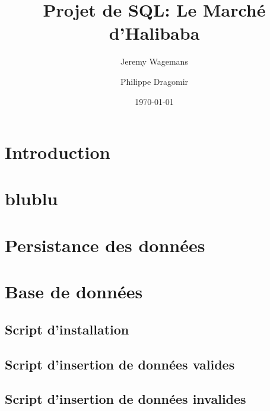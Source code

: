 \documentclass[11pt,a4paper]{report}
\title{Projet de SQL: Le Marché d'Halibaba}
\author{Jeremy Wagemans \and Philippe Dragomir}
\date{\today}
\begin{document}

\maketitle

\tableofcontents

\begingroup
\setlength{\parskip}{\baselineskip}
\chapter{Introduction}

\endgroup

\setlength{\parskip}{0pt}
\chapter{blublu}

\chapter{Persistance des données}

\chapter{Base de données}

\section{Script d'installation}

\newpage

\section{Script d'insertion de données valides}

\newpage

\section{Script d'insertion de données invalides}

\newpage
\end{document}
